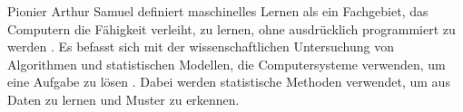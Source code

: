 \documentclass[german,bachelor]{swsLeipzig}
\begin{document}
Pionier Arthur Samuel definiert maschinelles Lernen als ein Fachgebiet, das Computern die Fähigkeit verleiht, zu lernen,
ohne ausdrücklich programmiert zu werden \cite[S. 381]{mahesh2020machine}.
Es befasst sich mit der wissenschaftlichen Untersuchung von Algorithmen und statistischen Modellen,
die Computersysteme verwenden, um eine Aufgabe zu lösen \cite[S. 381]{mahesh2020machine}.
Dabei werden statistische Methoden verwendet, um aus Daten zu lernen und Muster zu erkennen. \\






\end{document}
